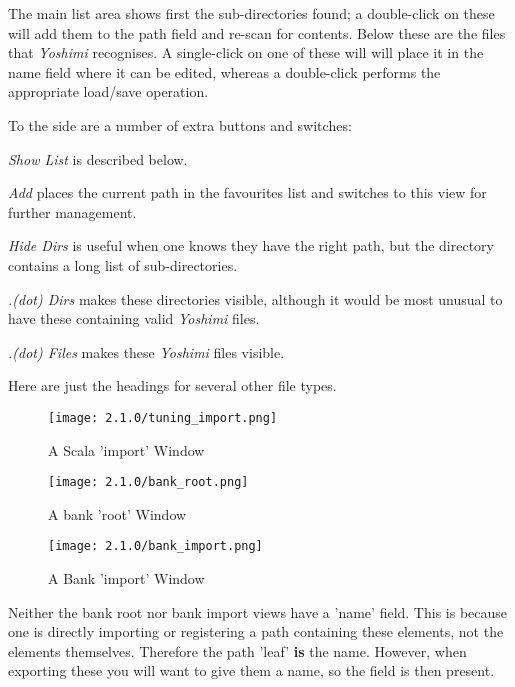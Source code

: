    The main list area shows first the sub-directories found; a double-click
   on these will add them to the path field and re-scan for contents. Below
   these are the files that \textsl{Yoshimi} recognises. A single-click on
   one of these will will place it in the name field where it can be edited,
   whereas a double-click performs the appropriate load/save operation.

   To the side are a number of extra buttons and switches:

   \textsl{Show List} is described below.

   \textsl{Add} places the current path in the favourites list and switches to
   this view for further management.

   \textsl{Hide Dirs} is useful when one knows they have the right path, but the
   directory contains a long list of sub-directories.

   \textsl{.(dot) Dirs} makes these directories visible, although it would be most
   unusual to have these containing valid \textsl{Yoshimi} files.

   \textsl{.(dot) Files} makes these \textsl{Yoshimi} files visible.

   Here are just the headings for several other file types.

   \begin{figure}[H]
      \centering
      \texttt{[image: 2.1.0/tuning\_import.png]}
      \caption{A Scala 'import' Window}
   \end{figure}

   \begin{figure}[H]
      \centering
      \texttt{[image: 2.1.0/bank\_root.png]}
      \caption{A bank 'root' Window}
      \label{fig:filer_bank_root_window}
   \end{figure}

   \begin{figure}[H]
      \centering
      \texttt{[image: 2.1.0/bank\_import.png]}
      \caption{A Bank 'import' Window}
      \label{fig:filer_bank_import_window}
   \end{figure}

   Neither the bank root nor bank import views have a 'name' field. This is
   because one is directly importing or registering a path containing these
   elements, not the elements themselves. Therefore the path 'leaf' \textbf{is}
   the name. However, when exporting these you will want to give them a name, so
   the field is then present.

